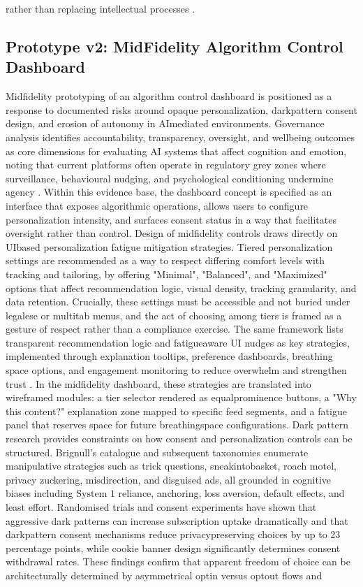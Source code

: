 \documentclass{article}
\begin{document}
rather than replacing intellectual processes \parencites[6]{5375614}[3]{7808872}.

\subsection{Prototype v2: Mid\-Fidelity Algorithm Control Dashboard}
\label{sec:prototype_v2_alg_control_dashboard} Mid\-fidelity prototyping of an algorithm control dashboard is positioned as a response to documented risks around opaque personalization, dark\-pattern consent design, and erosion of autonomy in AI\-mediated environments. Governance analysis identifies accountability, transparency, oversight, and well\-being outcomes as core dimensions for evaluating AI systems that affect cognition and emotion, noting that current platforms often operate in regulatory grey zones where surveillance, behavioural nudging, and psychological conditioning undermine agency \parencites[2]{7808872}[8]{7808872}. Within this evidence base, the dashboard concept is specified as an interface that exposes algorithmic operations, allows users to configure personalization intensity, and surfaces consent status in a way that facilitates oversight rather than control. Design of mid\-fidelity controls draws directly on UI\-based personalization fatigue mitigation strategies. Tiered personalization settings are recommended as a way to respect differing comfort levels with tracking and tailoring, by offering "Minimal", "Balanced", and "Maximized" options that affect recommendation logic, visual density, tracking granularity, and data retention. Crucially, these settings must be accessible and not buried under legalese or multi\-tab menus, and the act of choosing among tiers is framed as a gesture of respect rather than a compliance exercise. The same framework lists transparent recommendation logic and fatigue\-aware UI nudges as key strategies, implemented through explanation tooltips, preference dashboards, breathing space options, and engagement monitoring to reduce overwhelm and strengthen trust \parencites[6]{0270098}. In the mid\-fidelity dashboard, these strategies are translated into wireframed modules: a tier selector rendered as equal\-prominence buttons, a "Why this content?" explanation zone mapped to specific feed segments, and a fatigue panel that reserves space for future breathing\-space configurations. Dark pattern research provides constraints on how consent and personalization controls can be structured. Brignull's catalogue and subsequent taxonomies enumerate manipulative strategies such as trick questions, sneak\-into\-basket, roach motel, privacy zuckering, misdirection, and disguised ads, all grounded in cognitive biases including $ \text{System 1} $ reliance, anchoring, loss aversion, default effects, and least effort. Randomised trials and consent experiments have shown that aggressive dark patterns can increase subscription uptake dramatically and that dark\-pattern consent mechanisms reduce privacy\-preserving choices by up to $23$ percentage points, while cookie banner design significantly determines consent withdrawal rates. These findings confirm that apparent freedom of choice can be architecturally determined by asymmetrical opt\-in versus opt\-out flows and 
\end{document}
